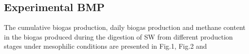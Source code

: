 \subsection{Experimental BMP}
The cumulative biogas production, daily biogas production and methane content in the biogas produced during the digestion of SW from different production stages under mesophilic conditions are presented in Fig.1, Fig.2 and 